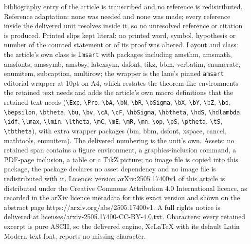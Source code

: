 \documentclass[10pt,a4paper]{amsart}
\begin{document}
bibliography entry of the article is transcribed and no reference is redistributed. Reference adaptation: none was needed and none was made; every reference inside the delivered unit resolves inside it, so no unresolved reference or citation is produced. Printed slips kept literal: no printed word, symbol, hypothesis or number of the counted statement or of its proof was altered. Layout and class: the article's own class is \texttt{imsart} with packages including amsthm, amsmath, amsfonts, amssymb, amsbsy, latexsym, dsfont, tikz, bbm, verbatim, enumerate, enumitem, subcaption, multirow; the wrapper is the lane's pinned \texttt{amsart} editorial wrapper at 10pt on A4, which restates the theorem-like environments the retained text needs and adds the article's own macro definitions that the retained text needs (\texttt{\textbackslash Exp}, \texttt{\textbackslash Pro}, \texttt{\textbackslash bA}, \texttt{\textbackslash bN}, \texttt{\textbackslash bR}, \texttt{\textbackslash bSigma}, \texttt{\textbackslash bX}, \texttt{\textbackslash bY}, \texttt{\textbackslash bZ}, \texttt{\textbackslash bd}, \texttt{\textbackslash bepsilon}, \texttt{\textbackslash btheta}, \texttt{\textbackslash bu}, \texttt{\textbackslash bv}, \texttt{\textbackslash cA}, \texttt{\textbackslash cF}, \texttt{\textbackslash hbSigma}, \texttt{\textbackslash hbtheta}, \texttt{\textbackslash hdS}, \texttt{\textbackslash hdlambda}, \texttt{\textbackslash idf}, \texttt{\textbackslash lmax}, \texttt{\textbackslash lmin}, \texttt{\textbackslash ltheta}, \texttt{\textbackslash mC}, \texttt{\textbackslash mE}, \texttt{\textbackslash mR}, \texttt{\textbackslash mn}, \texttt{\textbackslash op}, \texttt{\textbackslash pS}, \texttt{\textbackslash ptheta}, \texttt{\textbackslash tS}, \texttt{\textbackslash tbtheta}), with extra wrapper packages (bm, bbm, dsfont, xspace, cancel, mathtools, enumitem). The delivered numbering is the unit's own. Assets: no retained span contains a figure environment, a graphics-inclusion command, a PDF-page inclusion, a table or a TikZ picture; no image file is copied into this package, the package declares no asset dependency and no image file is redistributed with it. Licence: version arXiv:2505.17400v1 of this article is distributed under the Creative Commons Attribution 4.0 International licence, as recorded in the arXiv licence metadata for this exact version and shown on the abstract page https://arxiv.org/abs/2505.17400v1. A full rights notice is delivered at licenses/arxiv-2505.17400-CC-BY-4.0.txt. Characters: every retained excerpt is pure ASCII, so the delivered engine, XeLaTeX with its default Latin Modern text font, reports no missing character.
\end{document}
